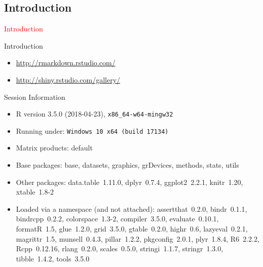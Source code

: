 \documentclass[11pt]{beamer}\usepackage[]{graphicx}\usepackage[]{color}
\begin{document}
\subsection{Introduction}

\begin{frame}
 \begin{center}
  \Huge{\textcolor{red}{Introduction}}
 \end{center}
\end{frame}


\begin{frame}{Introduction}
\begin{itemize}
\item \href{http://rmarkdown.rstudio.com/}{http://rmarkdown.rstudio.com/}
\item \href{http://shiny.rstudio.com/gallery/}{http://shiny.rstudio.com/gallery/}
\end{itemize}
\end{frame}





\begin{frame}[fragile]{Session Information}
\begin{itemize}\raggedright
  \item R version 3.5.0 (2018-04-23), \verb|x86_64-w64-mingw32|
  \item Running under: \verb|Windows 10 x64 (build 17134)|
  \item Matrix products: default
  \item Base packages: base, datasets, graphics, grDevices, methods,
    stats, utils
  \item Other packages: data.table~1.11.0, dplyr~0.7.4,
    ggplot2~2.2.1, knitr~1.20, xtable~1.8-2
  \item Loaded via a namespace (and not attached): assertthat~0.2.0,
    bindr~0.1.1, bindrcpp~0.2.2, colorspace~1.3-2, compiler~3.5.0,
    evaluate~0.10.1, formatR~1.5, glue~1.2.0, grid~3.5.0,
    gtable~0.2.0, highr~0.6, lazyeval~0.2.1, magrittr~1.5,
    munsell~0.4.3, pillar~1.2.2, pkgconfig~2.0.1, plyr~1.8.4,
    R6~2.2.2, Rcpp~0.12.16, rlang~0.2.0, scales~0.5.0, stringi~1.1.7,
    stringr~1.3.0, tibble~1.4.2, tools~3.5.0
\end{itemize}


\end{frame}
\end{document}
